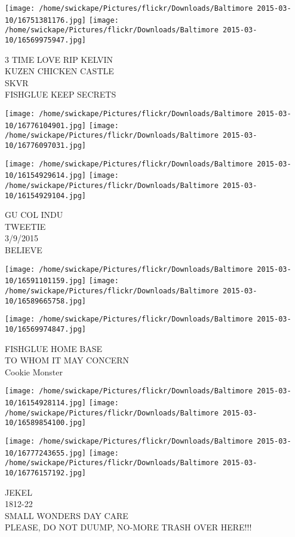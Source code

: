 \documentclass[10pt,letterpaper]{article}
\begin{document}
\texttt{[image: /home/swickape/Pictures/flickr/Downloads/Baltimore 2015-03-10/16751381176.jpg]}
\texttt{[image: /home/swickape/Pictures/flickr/Downloads/Baltimore 2015-03-10/16569975947.jpg]}

3 TIME LOVE RIP KELVIN\\
KUZEN CHICKEN CASTLE\\
SKVR\\
FISHGLUE KEEP SECRETS\\
\pagebreak

\texttt{[image: /home/swickape/Pictures/flickr/Downloads/Baltimore 2015-03-10/16776104901.jpg]}
\texttt{[image: /home/swickape/Pictures/flickr/Downloads/Baltimore 2015-03-10/16776097031.jpg]}

\texttt{[image: /home/swickape/Pictures/flickr/Downloads/Baltimore 2015-03-10/16154929614.jpg]}
\texttt{[image: /home/swickape/Pictures/flickr/Downloads/Baltimore 2015-03-10/16154929104.jpg]}

GU COL INDU\\
TWEETIE\\
3/9/2015\\
BELIEVE\\
\pagebreak

\texttt{[image: /home/swickape/Pictures/flickr/Downloads/Baltimore 2015-03-10/16591101159.jpg]}
\texttt{[image: /home/swickape/Pictures/flickr/Downloads/Baltimore 2015-03-10/16589665758.jpg]}

\vspace{0.25in}
\texttt{[image: /home/swickape/Pictures/flickr/Downloads/Baltimore 2015-03-10/16569974847.jpg]}

FISHGLUE HOME BASE\\
TO WHOM IT MAY CONCERN\\
Cookie Monster\\
\pagebreak

\texttt{[image: /home/swickape/Pictures/flickr/Downloads/Baltimore 2015-03-10/16154928114.jpg]}
\texttt{[image: /home/swickape/Pictures/flickr/Downloads/Baltimore 2015-03-10/16589854100.jpg]}

\texttt{[image: /home/swickape/Pictures/flickr/Downloads/Baltimore 2015-03-10/16777243655.jpg]}
\texttt{[image: /home/swickape/Pictures/flickr/Downloads/Baltimore 2015-03-10/16776157192.jpg]}

JEKEL\\
1812{-}22\\
SMALL WONDERS DAY CARE\\
PLEASE, DO NOT DUUMP, NO{-}MORE TRASH OVER HERE!!!\\
\pagebreak
\end{document}
